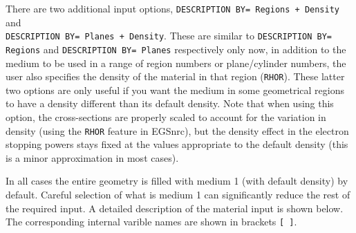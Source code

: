 \documentclass[12pt,twoside]{article}  %
\begin{document}
There are two additional input options, {\tt DESCRIPTION BY= Regions + Density}
and\\
 {\tt DESCRIPTION BY= Planes + Density}.  These are similar to
{\tt DESCRIPTION BY= Regions} and {\tt DESCRIPTION BY= Planes} respectively
only now, in addition to the medium to be used in a range of region numbers
or plane/cylinder numbers, the user also specifies the
density of the material in that region ({\tt RHOR}).
These latter two options are only useful if
you want the medium in some geometrical regions to have a density different
than its default density.  Note that when using this option, the
cross-sections are properly scaled to account for the variation in density
(using the {\tt RHOR} feature in EGSnrc), but the density effect in the
electron stopping powers stays fixed at the values appropriate to the
default density (this is a minor approximation in most cases).

In all cases the entire geometry is filled with medium 1 (with default
density) by
 default.  Careful selection of what is medium 1 can significantly reduce
the rest of the required input.  A detailed description of the material
input is shown below. The corresponding internal varible
names are shown in brackets \verb+[ ]+.
\end{document}
